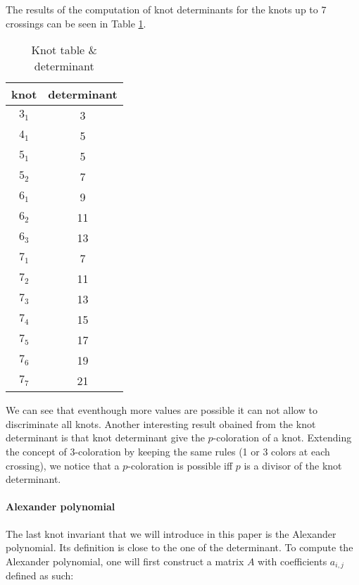 \documentclass[12pt, a4paper]{article}
\begin{document}
The results of the computation of knot determinants for the knots up to 7 crossings can be seen in Table \ref{tab:knot_determinant}.

\begin{table}[H]
\begin{center}
  \begin{tabular}{| c | c |}
    \hline
    knot & determinant\\
    \hline
    $3_1$ & 3\\
    \hline
    $4_1$ & 5\\
    \hline
    $5_1$ & 5\\
    \hline
    $5_2$ & 7\\
    \hline
    $6_1$ & 9\\
    \hline
    $6_2$ & 11\\
    \hline
    $6_3$ & 13\\
    \hline
    $7_1$ & 7\\
    \hline
    $7_2$ & 11\\
    \hline
    $7_3$ & 13\\
    \hline
    $7_4$ & 15\\
    \hline
    $7_5$ & 17\\
    \hline
    $7_6$ & 19\\
    \hline
    $7_7$ & 21\\
    \hline
  \end{tabular}
\end{center}
  \caption{Knot table \& determinant}
\label{tab:knot_determinant}
\end{table}

We can see that eventhough more values are possible it can not allow to discriminate all knots. Another interesting result obained from the knot determinant is that knot determinant give the $p$-coloration of a knot. Extending the concept of $3$-coloration by keeping the same rules (1 or 3 colors at each crossing), we notice that a $p$-coloration is possible iff $p$ is a divisor of the knot determinant.

\paragraph{Alexander polynomial}

The last knot invariant that we will introduce in this paper is the Alexander polynomial. Its definition is close to the one of the determinant. To compute the Alexander polynomial, one will first construct a matrix $A$ with coefficients $a_{i,j}$ defined as such: 
\end{document}
